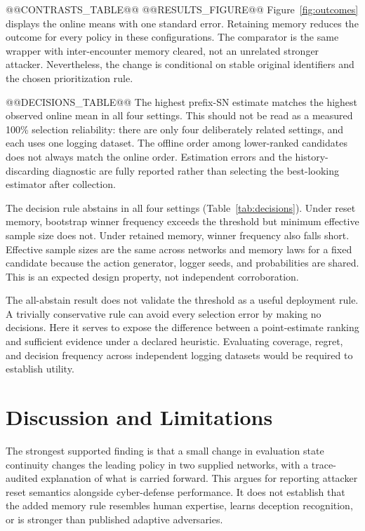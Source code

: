 \documentclass[sigconf,nonacm]{acmart}
\begin{document}
@@CONTRASTS_TABLE@@
@@RESULTS_FIGURE@@
Figure~\ref{fig:outcomes} displays the online means with one standard error. Retaining memory reduces the outcome for every policy in these configurations. The comparator is the same wrapper with inter-encounter memory cleared, not an unrelated stronger attacker. Nevertheless, the change is conditional on stable original identifiers and the chosen prioritization rule.

@@DECISIONS_TABLE@@
The highest prefix-SN estimate matches the highest observed online mean in all four settings. This should not be read as a measured 100\% selection reliability: there are only four deliberately related settings, and each uses one logging dataset. The offline order among lower-ranked candidates does not always match the online order. Estimation errors and the history-discarding diagnostic are fully reported rather than selecting the best-looking estimator after collection.

The decision rule abstains in all four settings (Table~\ref{tab:decisions}). Under reset memory, bootstrap winner frequency exceeds the threshold but minimum effective sample size does not. Under retained memory, winner frequency also falls short. Effective sample sizes are the same across networks and memory laws for a fixed candidate because the action generator, logger seeds, and probabilities are shared. This is an expected design property, not independent corroboration.

The all-abstain result does not validate the threshold as a useful deployment rule. A trivially conservative rule can avoid every selection error by making no decisions. Here it serves to expose the difference between a point-estimate ranking and sufficient evidence under a declared heuristic. Evaluating coverage, regret, and decision frequency across independent logging datasets would be required to establish utility.

\section{Discussion and Limitations}
The strongest supported finding is that a small change in evaluation state continuity changes the leading policy in two supplied networks, with a trace-audited explanation of what is carried forward. This argues for reporting attacker reset semantics alongside cyber-defense performance. It does not establish that the added memory rule resembles human expertise, learns deception recognition, or is stronger than published adaptive adversaries.
\end{document}
